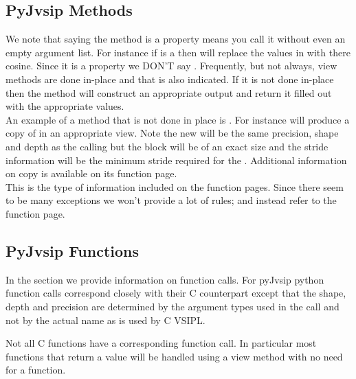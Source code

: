 \subsection*{PyJvsip Methods}
We note that saying the method is a property means you call it without even an empty argument list. For instance if  is a \pyjv {} then  will replace the values in  with there cosine. Since it is a property we DON'T say . Frequently, but not always, view methods are done in-place and that is also indicated. If it is not done in-place then the method will construct an appropriate output  and return it filled out with the appropriate values.\\
%
An example of a  method that is not done in place is . For instance  will produce a copy of  in an appropriate view. Note the new  will be the same precision, shape and depth as the calling  but the \ttbf block will be of an exact size and the stride information will be the minimum stride required for the . Additional information on copy is available on its function page.\\
%
This is the type of information included on the function pages. Since there seem to be many exceptions we won't provide a lot of rules; and instead refer to the function page.\\
%
\subsection*{PyJvsip Functions}
In the \pyjv {} section we provide information on function calls. For pyJvsip python function calls correspond closely with their C counterpart except that the shape, depth and precision are determined by the argument types used in the call and not by the actual name as is used by C VSIPL.

Not all C functions have a corresponding \pyjv function call. In particular most functions that return a value will be handled using a view method with no need for a function.
 

